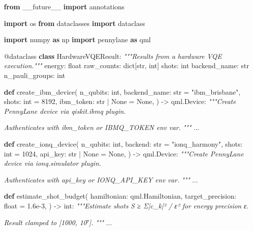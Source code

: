 \documentclass[
  11pt,
]{report}
\newenvironment{Shaded}{}{}
\newcommand{\AttributeTok}[1]{\textcolor[rgb]{0.49,0.56,0.16}{#1}}
\newcommand{\BuiltInTok}[1]{\textcolor[rgb]{0.00,0.50,0.00}{#1}}
\newcommand{\CommentTok}[1]{\textcolor[rgb]{0.38,0.63,0.69}{\textit{#1}}}
\newcommand{\DecValTok}[1]{\textcolor[rgb]{0.25,0.63,0.44}{#1}}
\newcommand{\FloatTok}[1]{\textcolor[rgb]{0.25,0.63,0.44}{#1}}
\newcommand{\ImportTok}[1]{\textcolor[rgb]{0.00,0.50,0.00}{\textbf{#1}}}
\newcommand{\KeywordTok}[1]{\textcolor[rgb]{0.00,0.44,0.13}{\textbf{#1}}}
\newcommand{\NormalTok}[1]{#1}
\newcommand{\OperatorTok}[1]{\textcolor[rgb]{0.40,0.40,0.40}{#1}}
\newcommand{\StringTok}[1]{\textcolor[rgb]{0.25,0.44,0.63}{#1}}
\newcommand{\VariableTok}[1]{\textcolor[rgb]{0.10,0.09,0.49}{#1}}
\begin{document}
\begin{Shaded}
\begin{Highlighting}[]
\ImportTok{from}\NormalTok{ \_\_future\_\_ }\ImportTok{import}\NormalTok{ annotations}

\ImportTok{import}\NormalTok{ os}
\ImportTok{from}\NormalTok{ dataclasses }\ImportTok{import}\NormalTok{ dataclass}

\ImportTok{import}\NormalTok{ numpy }\ImportTok{as}\NormalTok{ np}
\ImportTok{import}\NormalTok{ pennylane }\ImportTok{as}\NormalTok{ qml}


\AttributeTok{@dataclass}
\KeywordTok{class}\NormalTok{ HardwareVQEResult:}
    \CommentTok{"""Results from a hardware VQE execution."""}
\NormalTok{    energy: }\BuiltInTok{float}
\NormalTok{    raw\_counts: }\BuiltInTok{dict}\NormalTok{[}\BuiltInTok{str}\NormalTok{, }\BuiltInTok{int}\NormalTok{]}
\NormalTok{    shots: }\BuiltInTok{int}
\NormalTok{    backend\_name: }\BuiltInTok{str}
\NormalTok{    n\_pauli\_groups: }\BuiltInTok{int}


\KeywordTok{def}\NormalTok{ create\_ibm\_device(}
\NormalTok{    n\_qubits: }\BuiltInTok{int}\NormalTok{,}
\NormalTok{    backend\_name: }\BuiltInTok{str} \OperatorTok{=} \StringTok{"ibm\_brisbane"}\NormalTok{,}
\NormalTok{    shots: }\BuiltInTok{int} \OperatorTok{=} \DecValTok{8192}\NormalTok{,}
\NormalTok{    ibm\_token: }\BuiltInTok{str} \OperatorTok{|} \VariableTok{None} \OperatorTok{=} \VariableTok{None}\NormalTok{,}
\NormalTok{) }\OperatorTok{{-}\textgreater{}}\NormalTok{ qml.Device:}
    \CommentTok{"""Create PennyLane device via qiskit.ibmq plugin.}

\CommentTok{    Authenticates with ibm\_token or IBMQ\_TOKEN env var.}
\CommentTok{    """}
\NormalTok{    ...}


\KeywordTok{def}\NormalTok{ create\_ionq\_device(}
\NormalTok{    n\_qubits: }\BuiltInTok{int}\NormalTok{,}
\NormalTok{    backend: }\BuiltInTok{str} \OperatorTok{=} \StringTok{"ionq\_harmony"}\NormalTok{,}
\NormalTok{    shots: }\BuiltInTok{int} \OperatorTok{=} \DecValTok{1024}\NormalTok{,}
\NormalTok{    api\_key: }\BuiltInTok{str} \OperatorTok{|} \VariableTok{None} \OperatorTok{=} \VariableTok{None}\NormalTok{,}
\NormalTok{) }\OperatorTok{{-}\textgreater{}}\NormalTok{ qml.Device:}
    \CommentTok{"""Create PennyLane device via ionq.simulator plugin.}

\CommentTok{    Authenticates with api\_key or IONQ\_API\_KEY env var.}
\CommentTok{    """}
\NormalTok{    ...}


\KeywordTok{def}\NormalTok{ estimate\_shot\_budget(}
\NormalTok{    hamiltonian: qml.Hamiltonian,}
\NormalTok{    target\_precision: }\BuiltInTok{float} \OperatorTok{=} \FloatTok{1.6e{-}3}\NormalTok{,}
\NormalTok{) }\OperatorTok{{-}\textgreater{}} \BuiltInTok{int}\NormalTok{:}
    \CommentTok{"""Estimate shots S ≥ Σ|c\_k|² / ε² for energy precision ε.}

\CommentTok{    Result clamped to [1000, 10⁷].}
\CommentTok{    """}
\NormalTok{    ...}
\end{Highlighting}
\end{Shaded}
\end{document}
